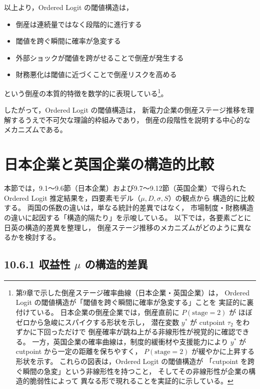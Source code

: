 以上より，Ordered Logit の閾値構造は，

\begin{itemize}
    \item 倒産は連続量ではなく段階的に進行する  
    \item 閾値を跨ぐ瞬間に確率が急変する  
    \item 外部ショックが閾値を跨がせることで倒産が発生する  
    \item 財務悪化は閾値に近づくことで倒産リスクを高める  
\end{itemize}

という倒産の本質的特徴を数学的に表現している\footnote{
第9章で示した倒産ステージ確率曲線（日本企業・英国企業）は，
Ordered Logit の閾値構造が「閾値を跨ぐ瞬間に確率が急変する」ことを
実証的に裏付けている。
日本企業の倒産企業では，倒産直前に $P(\text{stage}=2)$ が
ほぼゼロから急峻にスパイクする形状を示し，
潜在変数 $y^*$ が cutpoint $\tau_2$ をわずかに下回っただけで
倒産確率が跳ね上がる非線形性が視覚的に確認できる。
一方，英国企業の確率曲線は，制度的緩衝材や支援能力により
$y^*$ が cutpoint から一定の距離を保ちやすく，
$P(\text{stage}=2)$ が緩やかに上昇する形状を示す。
これらの図表は，Ordered Logit の閾値構造が
「cutpoint を跨ぐ瞬間の急変」という非線形性を持つこと，
そしてその非線形性が企業の構造的脆弱性によって
異なる形で現れることを実証的に示している。}。

したがって，Ordered Logit の閾値構造は，
新電力企業の倒産ステージ推移を理解するうえで不可欠な理論的枠組みであり，
倒産の段階性を説明する中心的なメカニズムである。


\section{日本企業と英国企業の構造的比較}

本節では，9.1～9.6節（日本企業）および9.7～9.12節（英国企業）で得られた
Ordered Logit 推定結果を，四要素モデル（$\mu, D, \sigma, S$）の観点から
構造的に比較する。
両国の係数の違いは，単なる統計的差異ではなく，
市場制度・財務構造の違いに起因する「構造的隔たり」を示唆している。
以下では，各要素ごとに日英の構造的差異を整理し，
倒産ステージ推移のメカニズムがどのように異なるかを検討する。

\subsection*{10.6.1 収益性 $\mu$ の構造的差異}

